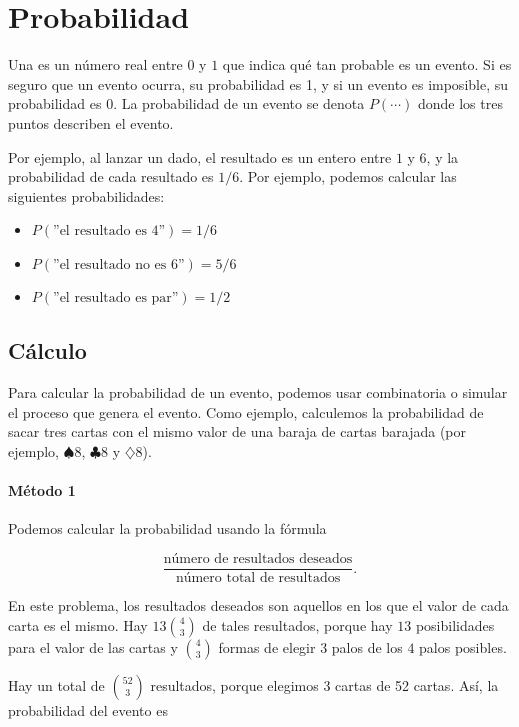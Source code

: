 \chapter{Probabilidad}


Una  es un número real entre $0$ y $1$
que indica qué tan probable es un evento.
Si es seguro que un evento ocurra,
su probabilidad es 1,
y si un evento es imposible,
su probabilidad es 0.
La probabilidad de un evento se denota $P(\cdots)$
donde los tres puntos describen el evento.

Por ejemplo, al lanzar un dado,
el resultado es un entero entre $1$ y $6$,
y la probabilidad de cada resultado es $1/6$.
Por ejemplo, podemos calcular las siguientes probabilidades:

\begin{itemize}[noitemsep]
\item $P(\textrm{''el resultado es 4''})=1/6$
\item $P(\textrm{''el resultado no es 6''})=5/6$
\item $P(\textrm{''el resultado es par''})=1/2$
\end{itemize}

\section{Cálculo}

Para calcular la probabilidad de un evento,
podemos usar combinatoria
o simular el proceso que genera el evento.
Como ejemplo, calculemos la probabilidad
de sacar tres cartas con el mismo valor
de una baraja de cartas barajada
(por ejemplo, $\spadesuit 8$, $\clubsuit 8$ y $\diamondsuit 8$).

\subsubsection*{Método 1}

Podemos calcular la probabilidad usando la fórmula

\[\frac{\textrm{número de resultados deseados}}{\textrm{número total de resultados}}.\]

En este problema, los resultados deseados son aquellos
en los que el valor de cada carta es el mismo.
Hay $13 {4 \choose 3}$ de tales resultados,
porque hay $13$ posibilidades para el
valor de las cartas y ${4 \choose 3}$ formas de
elegir $3$ palos de los $4$ palos posibles.

Hay un total de ${52 \choose 3}$ resultados,
porque elegimos 3 cartas de 52 cartas.
Así, la probabilidad del evento es

